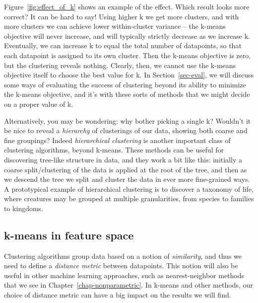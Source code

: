 Figure~\ref{fig:effect_of_k} shows an example of the effect.  Which
result looks more correct? It can be hard to say! Using higher k we
get more clusters, and with more clusters we can achieve lower
within-cluster variance -- the k-means objective will never increase,
and will typically strictly decrease as we increase k. Eventually, we
can increase k to equal the total number of datapoints, so that each
datapoint is assigned to its own cluster. Then the k-means objective
is zero, but the clustering reveals nothing.  Clearly, then, we cannot
use the k-means objective itself to choose the best value for k. In
Section~\ref{sec-eval}, we will discuss some ways of evaluating the
success of clustering beyond its ability to minimize the k-means
objective, and it's with these sorts of methods that we might decide
on a proper value of k.

Alternatively, you may be wondering: why bother picking a single k?
Wouldn't it be nice to reveal a \textit{hierarchy} of clusterings of
our data, showing both coarse and fine groupings? Indeed
\textit{hierarchical clustering}  is another important class of
clustering algorithms, beyond k-means. These methods can be useful for
discovering tree-like structure in data, and they work a bit like this: initially a coarse
split/clustering of the data is applied at the root of the tree, and then as we
descend the tree we split and cluster the data in ever more fine-grained ways. A
prototypical example of hierarchical clustering is to discover a
taxonomy of life, where creatures may be grouped at multiple
granularities, from species to families to kingdoms.





\subsection{k-means in feature space}

Clustering algorithms group data based on a notion of
\textit{similarity}, and thus we need to define a \textit{distance metric}
between datapoints. This notion
will also be useful in other machine learning approaches,
such as nearest-neighbor methods that we see in Chapter~\ref{chap-nonparametric}.
In k-means and other methods, our choice of distance
metric can have a big impact on the results we will find.

